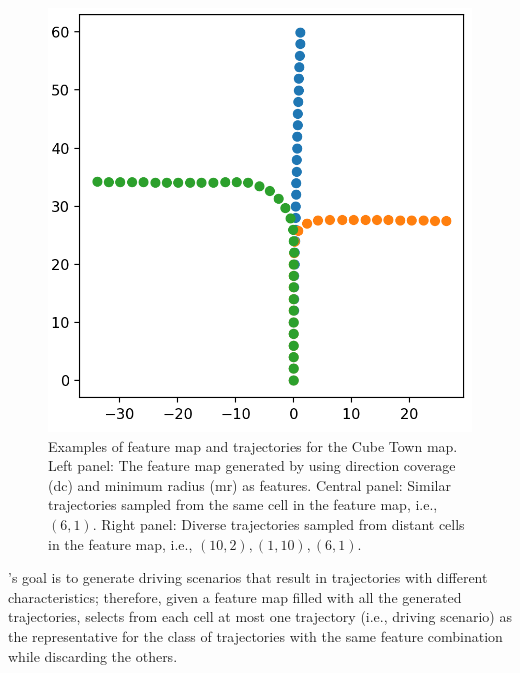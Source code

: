 \documentclass[conference]{IEEEtran}
\begin{document}
\begin{figure}[t]
\endminipage\hfill
{}%
  \includegraphics[width=\linewidth]{images/roads_different_cell.png}
\endminipage
\caption{Examples of feature map and trajectories for the Cube Town map. 
Left panel: The feature map generated by \tool using direction coverage (dc) and minimum radius (mr) as features.
Central panel: Similar trajectories sampled from the same cell in the feature map, i.e., $(6,1)$.  
Right panel: Diverse trajectories sampled from distant cells in the feature map, i.e., $(10,2), (1,10), (6,1)$.}
\label{fig:feature-maps}
\end{figure}

\tool's goal is to generate driving scenarios that result in trajectories with different characteristics; therefore, given a feature map filled with all the generated trajectories, \tool selects from each cell at most one trajectory (i.e., driving scenario) as the representative for the class of trajectories with the same feature combination while discarding the others.
\end{document}
